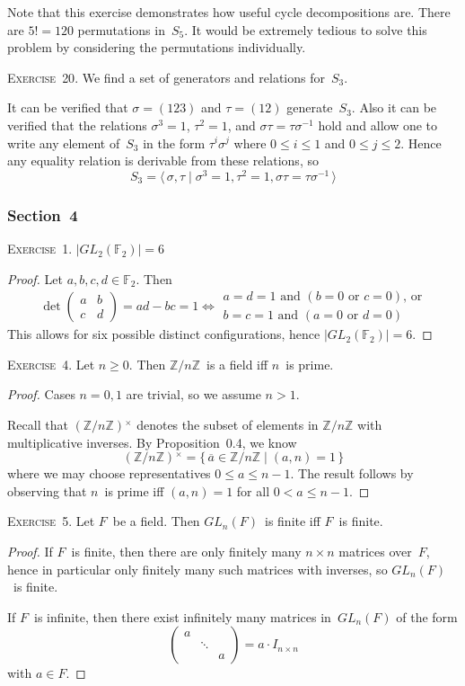 \documentclass[letterpaper]{article}
\newcommand{\exercise}[1]{\goodbreak\noindent\textsc{Exercise~{#1}.}}
\newcommand{\Z}{\mathbb{Z}}
\newcommand{\F}{\mathbb{F}}
\newcommand{\mi}[1]{{#1}{}^{\times}}
\newcommand{\res}[1]{\overline{#1}}
\renewcommand{\gcd}[2]{({#1},{#2})}
\newcommand{\ord}[1]{|{#1}|}
\newcommand{\pres}[1]{\langle{#1}\rangle}
\begin{document}
Note that this exercise demonstrates how useful cycle decompositions are. There are $5!=120$ permutations in~$S_5$. It would be extremely tedious to solve this problem by considering the permutations individually.

\bigskip
\exercise{20}
We find a set of generators and relations for~$S_3$.

It can be verified that $\sigma=(123)$ and $\tau=(12)$ generate~$S_3$. Also it can be verified that the relations $\sigma^3=1$, $\tau^2=1$, and $\sigma\tau=\tau\sigma^{-1}$ hold and allow one to write any element of~$S_3$ in the form $\tau^i\sigma^j$ where $0\le i\le 1$ and $0\le j\le 2$. Hence any equality relation is derivable from these relations, so
$$S_3=\pres{\,\sigma,\tau\mid\sigma^3=1,\tau^2=1,\sigma\tau=\tau\sigma^{-1}\,}$$

\subsubsection*{Section~4}
\exercise{1}
$\ord{GL_2(\F_2)}=6$
\begin{proof}
Let $a,b,c,d\in\F_2$. Then
$$\det\left(\begin{matrix}
a&b\\
c&d
\end{matrix}\right)=ad-bc=1\iff
\begin{array}{l}
a=d=1\text{ and }(b=0\text{ or }c=0)\text{, or}\\
b=c=1\text{ and }(a=0\text{ or }d=0)
\end{array}$$
This allows for six possible distinct configurations, hence $\ord{GL_2(\F_2)}=6$.
\end{proof}

\exercise{4}
Let $n\ge 0$. Then $\Z/n\Z$~is a field iff $n$~is prime.
\begin{proof}
Cases $n=0,1$ are trivial, so we assume $n>1$.

Recall that $\mi{(\Z/n\Z)}$ denotes the subset of elements in $\Z/n\Z$ with multiplicative inverses. By Proposition~0.4, we know
$$\mi{(\Z/n\Z)}=\{\,\res{a}\in\Z/n\Z\mid\gcd{a}{n}=1\,\}$$
where we may choose representatives $0\le a\le n-1$. The result follows by observing that $n$~is prime iff $\gcd{a}{n}=1$ for all $0<a\le n-1$.
\end{proof}

\exercise{5}
Let $F$~be a field. Then $GL_n(F)$~is finite iff $F$~is finite.
\begin{proof}
If $F$~is finite, then there are only finitely many $n\times n$ matrices over~$F$, hence in particular only finitely many such matrices with inverses, so $GL_n(F)$~is finite.

If $F$~is infinite, then there exist infinitely many matrices in~$GL_n(F)$ of the form
$$\left(\begin{matrix}
a&      & \\
 &\ddots& \\
 &      &a
\end{matrix}\right)=a\cdot I_{n\times n}$$
with $a\in F$.
\end{proof}
\end{document}
